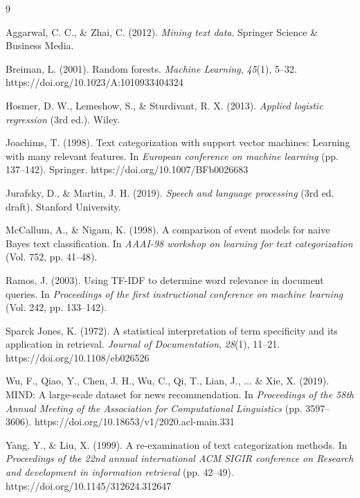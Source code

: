 \documentclass[12pt,a4paper]{article}
\begin{document}

\begin{thebibliography}{9}

Aggarwal, C. C., \& Zhai, C. (2012). \textit{Mining text data}. Springer Science \& Business Media.

Breiman, L. (2001). Random forests. \textit{Machine Learning}, \textit{45}(1), 5--32. https://doi.org/10.1023/A:1010933404324

Hosmer, D. W., Lemeshow, S., \& Sturdivant, R. X. (2013). \textit{Applied logistic regression} (3rd ed.). Wiley.

Joachims, T. (1998). Text categorization with support vector machines: Learning with many relevant features. In \textit{European conference on machine learning} (pp. 137--142). Springer. https://doi.org/10.1007/BFb0026683

Jurafsky, D., \& Martin, J. H. (2019). \textit{Speech and language processing} (3rd ed. draft). Stanford University.

McCallum, A., \& Nigam, K. (1998). A comparison of event models for naive Bayes text classification. In \textit{AAAI-98 workshop on learning for text categorization} (Vol. 752, pp. 41--48).

Ramos, J. (2003). Using TF-IDF to determine word relevance in document queries. In \textit{Proceedings of the first instructional conference on machine learning} (Vol. 242, pp. 133--142).

Sparck Jones, K. (1972). A statistical interpretation of term specificity and its application in retrieval. \textit{Journal of Documentation}, \textit{28}(1), 11--21. https://doi.org/10.1108/eb026526

Wu, F., Qiao, Y., Chen, J. H., Wu, C., Qi, T., Lian, J., ... \& Xie, X. (2019). MIND: A large-scale dataset for news recommendation. In \textit{Proceedings of the 58th Annual Meeting of the Association for Computational Linguistics} (pp. 3597--3606). https://doi.org/10.18653/v1/2020.acl-main.331

Yang, Y., \& Liu, X. (1999). A re-examination of text categorization methods. In \textit{Proceedings of the 22nd annual international ACM SIGIR conference on Research and development in information retrieval} (pp. 42--49). https://doi.org/10.1145/312624.312647

\end{thebibliography}
\end{document}
